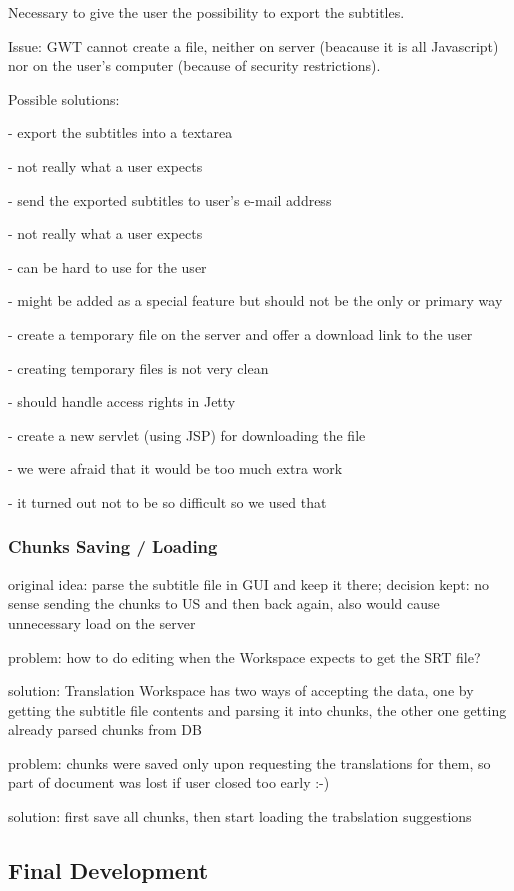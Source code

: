 Necessary to give the user the possibility to export the subtitles.

Issue: GWT cannot create a file, neither on server (beacause it is all Javascript) nor on the user's computer (because of security restrictions).

Possible solutions:

- export the subtitles into a textarea

  - not really what a user expects

- send the exported subtitles to user's e-mail address

  - not really what a user expects
  
  - can be hard to use for the user
  
  - might be added as a special feature but should not be the only or primary way

- create a temporary file on the server and offer a download link to the user

  - creating temporary files is not very clean
  
  - should handle access rights in Jetty

- create a new servlet (using JSP) for downloading the file

  - we were afraid that it would be too much extra work
  
  - it turned out not to be so difficult so we used that

\subsubsection{Chunks Saving / Loading}

original idea: parse the subtitle file in GUI and keep it there; decision kept: no sense sending the chunks to US and then back again, also would cause unnecessary load on the server

problem: how to do editing when the Workspace expects to get the SRT file?

solution: Translation Workspace has two ways of accepting the data, one by getting the subtitle file contents and parsing it into chunks, the other one getting already parsed chunks from DB


problem: chunks were saved only upon requesting the translations for them, so part of document was lost if user closed too early :-)

solution: first save all chunks, then start loading the trabslation suggestions

\subsection{Final Development}
\label{subsec:final_development}


